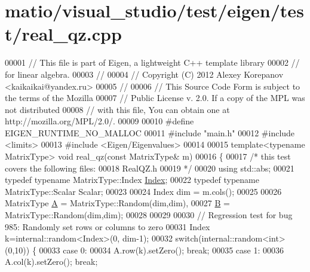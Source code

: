 \hypertarget{matio_2visual__studio_2test_2eigen_2test_2real__qz_8cpp_source}{}\section{matio/visual\+\_\+studio/test/eigen/test/real\+\_\+qz.cpp}
\label{matio_2visual__studio_2test_2eigen_2test_2real__qz_8cpp_source}

\begin{DoxyCode}
00001 \textcolor{comment}{// This file is part of Eigen, a lightweight C++ template library}
00002 \textcolor{comment}{// for linear algebra.}
00003 \textcolor{comment}{//}
00004 \textcolor{comment}{// Copyright (C) 2012 Alexey Korepanov <kaikaikai@yandex.ru>}
00005 \textcolor{comment}{//}
00006 \textcolor{comment}{// This Source Code Form is subject to the terms of the Mozilla}
00007 \textcolor{comment}{// Public License v. 2.0. If a copy of the MPL was not distributed}
00008 \textcolor{comment}{// with this file, You can obtain one at http://mozilla.org/MPL/2.0/.}
00009 
00010 \textcolor{preprocessor}{#define EIGEN\_RUNTIME\_NO\_MALLOC}
00011 \textcolor{preprocessor}{#include "main.h"}
00012 \textcolor{preprocessor}{#include <limits>}
00013 \textcolor{preprocessor}{#include <Eigen/Eigenvalues>}
00014 
00015 \textcolor{keyword}{template}<\textcolor{keyword}{typename} MatrixType> \textcolor{keywordtype}{void} real\_qz(\textcolor{keyword}{const} MatrixType& m)
00016 \{
00017   \textcolor{comment}{/* this test covers the following files:}
00018 \textcolor{comment}{     RealQZ.h}
00019 \textcolor{comment}{  */}
00020   \textcolor{keyword}{using} std::abs;
00021   \textcolor{keyword}{typedef} \textcolor{keyword}{typename} MatrixType::Index \hyperlink{namespace_eigen_a62e77e0933482dafde8fe197d9a2cfde}{Index};
00022   \textcolor{keyword}{typedef} \textcolor{keyword}{typename} MatrixType::Scalar Scalar;
00023   
00024   Index dim = m.cols();
00025   
00026   MatrixType \hyperlink{group___core___module_class_eigen_1_1_matrix}{A} = MatrixType::Random(dim,dim),
00027              \hyperlink{group___core___module_class_eigen_1_1_matrix}{B} = MatrixType::Random(dim,dim);
00028 
00029 
00030   \textcolor{comment}{// Regression test for bug 985: Randomly set rows or columns to zero}
00031   Index k=internal::random<Index>(0, dim-1);
00032   \textcolor{keywordflow}{switch}(internal::random<int>(0,10)) \{
00033   \textcolor{keywordflow}{case} 0:
00034     A.row(k).setZero(); \textcolor{keywordflow}{break};
00035   \textcolor{keywordflow}{case} 1:
00036     A.col(k).setZero(); \textcolor{keywordflow}{break};

\end{DoxyCode}
